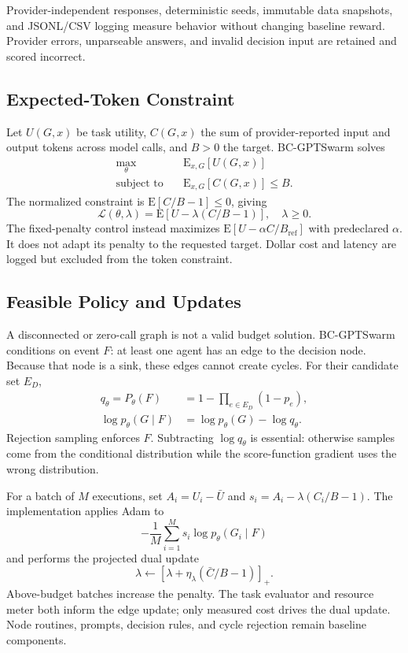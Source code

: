\documentclass[journal]{IEEEtran}
\begin{document}
Provider-independent responses, deterministic seeds, immutable data snapshots, and JSONL/CSV logging measure behavior without changing baseline reward. Provider errors, unparseable answers, and invalid decision input are retained and scored incorrect.

\subsection{Expected-Token Constraint}
Let $U(G,x)$ be task utility, $C(G,x)$ the sum of provider-reported input and output tokens across model calls, and $B>0$ the target. BC-GPTSwarm solves
\begin{align}
 \max_\theta\quad &\mathrm{E}_{x,G}[U(G,x)]\\
 \text{subject to}\quad &\mathrm{E}_{x,G}[C(G,x)]\leq B.
\end{align}
The normalized constraint is $\mathrm{E}[C/B-1]\leq0$, giving
\begin{equation}
 \mathcal L(\theta,\lambda)=
 \mathrm{E}[U-\lambda(C/B-1)],\quad\lambda\geq0.
\end{equation}
The fixed-penalty control instead maximizes $\mathrm{E}[U-\alpha C/B_{\mathrm{ref}}]$ with predeclared $\alpha$. It does not adapt its penalty to the requested target. Dollar cost and latency are logged but excluded from the token constraint.

\subsection{Feasible Policy and Updates}
A disconnected or zero-call graph is not a valid budget solution. BC-GPTSwarm conditions on event $F$: at least one agent has an edge to the decision node. Because that node is a sink, these edges cannot create cycles. For their candidate set $E_D$,
\begin{align}
 q_\theta=P_\theta(F)&=1-\prod_{e\in E_D}(1-p_e),\\
 \log p_\theta(G\mid F)&=\log p_\theta(G)-\log q_\theta.
\end{align}
Rejection sampling enforces $F$. Subtracting $\log q_\theta$ is essential: otherwise samples come from the conditional distribution while the score-function gradient uses the wrong distribution.

For a batch of $M$ executions, set $A_i=U_i-\bar U$ and $s_i=A_i-\lambda(C_i/B-1)$. The implementation applies Adam to
\begin{equation}
 -\frac{1}{M}\sum_{i=1}^M s_i\log p_\theta(G_i\mid F)
\end{equation}
and performs the projected dual update
\begin{equation}
 \lambda\leftarrow[\lambda+\eta_\lambda(\bar C/B-1)]_+.
\end{equation}
Above-budget batches increase the penalty. The task evaluator and resource meter both inform the edge update; only measured cost drives the dual update. Node routines, prompts, decision rules, and cycle rejection remain baseline components.
\end{document}

